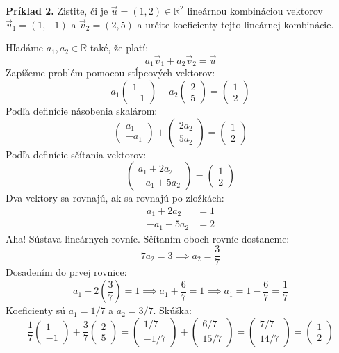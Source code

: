\documentclass[11pt]{article}
\renewcommand{\vec}[1]{\overrightarrow{#1}}
\newcommand{\R}{\mathbb{R}}
\begin{document}
\vspace{1em}
\noindent\textbf{Príklad 2.} Zistite, či je $\vec{u}=(1,2) \in \R^2$ lineárnou kombináciou vektorov $\vec{v}_1=(1,-1)$ a $\vec{v}_2=(2,5)$ a určite koeficienty tejto lineárnej kombinácie.

\noindent Hľadáme $a_1, a_2 \in \R$ také, že platí:
$$ a_1 \vec{v}_1 + a_2 \vec{v}_2 = \vec{u} $$
Zapíšeme problém pomocou stĺpcových vektorov:
$$ a_1 \begin{pmatrix} 1 \\ -1 \end{pmatrix} + a_2 \begin{pmatrix} 2 \\ 5 \end{pmatrix} = \begin{pmatrix} 1 \\ 2 \end{pmatrix} $$
Podľa definície násobenia skalárom:
$$ \begin{pmatrix} a_1 \\ -a_1 \end{pmatrix} + \begin{pmatrix} 2a_2 \\ 5a_2 \end{pmatrix} = \begin{pmatrix} 1 \\ 2 \end{pmatrix} $$
Podľa definície sčítania vektorov:
$$ \begin{pmatrix} a_1 + 2a_2 \\ -a_1 + 5a_2 \end{pmatrix} = \begin{pmatrix} 1 \\ 2 \end{pmatrix} $$
Dva vektory sa rovnajú, ak sa rovnajú po zložkách:
\begin{align*}
    a_1 + 2a_2 &= 1 \\
    -a_1 + 5a_2 &= 2
\end{align*}
Aha! Sústava lineárnych rovníc.
Sčítaním oboch rovníc dostaneme:
$$ 7a_2 = 3 \implies a_2 = \frac{3}{7} $$
Dosadením do prvej rovnice:
$$ a_1 + 2\left(\frac{3}{7}\right) = 1 \implies a_1 + \frac{6}{7} = 1 \implies a_1 = 1 - \frac{6}{7} = \frac{1}{7} $$
Koeficienty sú $a_1=1/7$ a $a_2=3/7$.
Skúška:
$$ \frac{1}{7} \begin{pmatrix} 1 \\ -1 \end{pmatrix} + \frac{3}{7} \begin{pmatrix} 2 \\ 5 \end{pmatrix} = \begin{pmatrix} 1/7 \\ -1/7 \end{pmatrix} + \begin{pmatrix} 6/7 \\ 15/7 \end{pmatrix} = \begin{pmatrix} 7/7 \\ 14/7 \end{pmatrix} = \begin{pmatrix} 1 \\ 2 \end{pmatrix} $$
\end{document}
